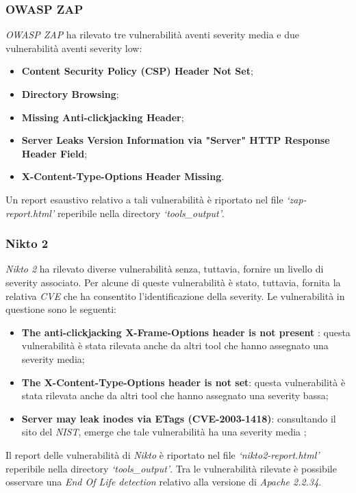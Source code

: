 \documentclass[a4paper,11pt,oneside,top=3cm,bottom=3cm,left=3.5cm,right=3.5cm,openright,reqno,table]{book}
\begin{document}
\subsubsection{OWASP ZAP}
\emph{OWASP ZAP} ha rilevato tre vulnerabilità aventi severity media e due vulnerabilità aventi severity low:
\begin{itemize}
    \item \textbf{Content Security Policy (CSP) Header Not Set};
    \item \textbf{Directory Browsing};
    \item \textbf{Missing Anti-clickjacking Header};
    \item \textbf{Server Leaks Version Information via "Server" HTTP Response Header Field};
    \item \textbf{X-Content-Type-Options Header Missing}.
\end{itemize}
Un report esaustivo relativo a tali vulnerabilità è riportato nel file \emph{`zap-report.html'} reperibile nella directory \emph{`tools\_output'}.

\subsubsection{Nikto 2}
\emph{Nikto 2} ha rilevato diverse vulnerabilità senza, tuttavia, fornire un livello di severity associato. Per alcune di queste vulnerabilità è stato, tuttavia, fornita la relativa \emph{CVE} che ha consentito l'identificazione della severity. Le vulnerabilità in questione sono le seguenti:
\begin{itemize}
    \item \textbf{The anti-clickjacking X-Frame-Options header is not present }: questa vulnerabilità è stata rilevata anche da altri tool che hanno assegnato una severity media;
    \item \textbf{The X-Content-Type-Options header is not set}: questa vulnerabilità è stata rilevata anche da altri tool che hanno assegnato una severity bassa;
    \item \textbf{Server may leak inodes via ETags (CVE-2003-1418)}: consultando il sito del \emph{NIST}, emerge che tale vulnerabilità ha una severity media \cite{inode};
\end{itemize}
Il report delle vulnerabilità di \emph{Nikto} è riportato nel file \emph{`nikto2-report.html'} reperibile nella directory \emph{`tools\_output'}. Tra le vulnerabilità rilevate è possibile osservare una \emph{End Of Life detection} relativo alla versione di \emph{Apache 2.2.34}. 
\end{document}

